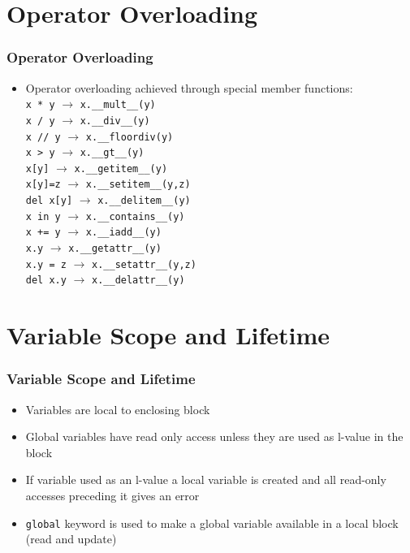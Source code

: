 \documentclass[trans,compress,xcolor=table]{beamer}
\begin{document}
\section{Operator Overloading}
\begin{frame}
\frametitle{Operator Overloading}
\begin{itemize}
\item Operator overloading achieved through special
	member functions:\\
\lstinline'x * y' $\rightarrow$ \lstinline!x.__mult__(y)!\\
\lstinline'x / y' $\rightarrow$ \lstinline!x.__div__(y)!\\
\lstinline'x // y' $\rightarrow$ \lstinline!x.__floordiv(y)!\\
\lstinline'x > y' $\rightarrow$ \lstinline!x.__gt__(y)!\\
\lstinline'x[y]' $\rightarrow$ \lstinline!x.__getitem__(y)!\\
\lstinline'x[y]=z' $\rightarrow$ \lstinline!x.__setitem__(y,z)!\\
\lstinline'del x[y]' $\rightarrow$ \lstinline!x.__delitem__(y)!\\
\lstinline'x in y' $\rightarrow$ \lstinline!x.__contains__(y)!\\
\lstinline'x += y' $\rightarrow$ \lstinline!x.__iadd__(y)!\\
\lstinline'x.y' $\rightarrow$ \lstinline!x.__getattr__(y)!\\
\lstinline'x.y = z' $\rightarrow$ \lstinline!x.__setattr__(y,z)!\\
\lstinline'del x.y' $\rightarrow$ \lstinline!x.__delattr__(y)!\\
\end{itemize}

\end{frame}

\section{Variable Scope and Lifetime}
\begin{frame}
\frametitle{Variable Scope and Lifetime}
\begin{itemize}
\item Variables are local to enclosing block
\item Global variables have read only access unless
	they are used as l-value in the block
\item If variable used as an l-value a local variable
	is created and all read-only accesses preceding
	it gives an error
\item \lstinline'global' keyword is used to make a global variable
	available in a local block (read and update)
\end{itemize}
\end{frame}
\end{document}
